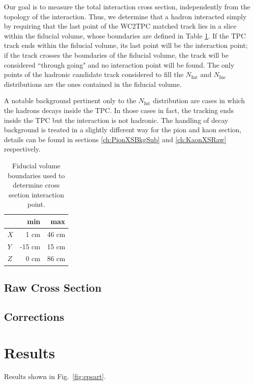 \documentclass[aps,prl,twocolumn,showpacs,superscriptaddress,groupedaddress]{revtex4}  %
\begin{document}
Our goal is to measure the total interaction cross section, independently  from the topology of the interaction. Thus, we determine that a hadron interacted simply by requiring that the last point of the WC2TPC matched track lies in a slice within the fiducial volume, whose boundaries are defined in Table \ref{tab:FidVol}. If the TPC track ends within the fiducial volume, its last point will be the interaction point; if the track crosses the boundaries of the fiducial volume, the track will be considered ``through going" and no interaction point will be found. The only points of the hadronic candidate track considered to fill the  $N_{\text{Int}}$ and  $N_{\text{Inc}}$ distributions are the ones contained in the fiducial volume. 
 
 A notable background pertinent only to the $N_{\text{Int}}$  distribution are cases in which the hadrons decays inside the TPC. In those cases in fact, the tracking ends inside the TPC but the interaction is not hadronic. The handling of decay background is treated in a slightly different way for the pion and kaon section, details can be found in sections \ref{ch:PionXSBkgSub} and \ref{ch:KaonXSRaw} respectively.



\begin{table}[t]
\centering
\begin{tabular}{|l|r|r|}
\hline
& min   &  max  \\ \hline
$X$ & 1 cm   & 46 cm  \\ \hline
$Y$ & -15 cm   & 15  cm  \\ \hline
$Z$ & 0 cm   & 86 cm  \\ \hline
\end{tabular}
\caption{Fiducial volume boundaries used to determine cross section interaction point. }
\label{tab:FidVol}
\end{table}


\subsection{\label{sec:RawXS}Raw Cross Section}
\subsection{\label{sec:Corrections}Corrections}

\section{\label{sec:Results}Results}
Results shown in Fig.~\ref{fig:epsart}.
\end{document}

